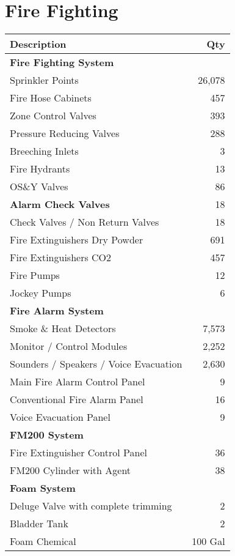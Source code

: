 \documentclass[oneside, justified, 11pt, a4paper]{tufte-book}
\begin{document}
\section{Fire Fighting}

\begin{tabular}{lr}
\toprule
\textbf{Description}	 &\textbf{Qty}\\
\midrule 	 
\textbf{Fire Fighting System}	 &\\
Sprinkler Points	    &26,078\\
Fire Hose Cabinets	    &457 \\
Zone Control Valves	    &393 \\
Pressure Reducing Valves	 &288 \\
Breeching Inlets	        &3\\ 
Fire Hydrants	            &13\\ 
OS\&Y Valves	               &86\\ 
\textbf{Alarm Check Valves}	              &18 \\
Check Valves / Non Return Valves &18 \\
Fire Extinguishers Dry Powder	 &691 \\
Fire Extinguishers CO2	           &457 \\
Fire Pumps	                     &12 \\
Jockey Pumps	                     &6 \\
\midrule 	 
\textbf{Fire Alarm System}	 &\\
Smoke \& Heat Detectors	 &7,573 \\
Monitor / Control Modules	       &2,252 \\
Sounders / Speakers / Voice Evacuation	   &2,630 \\
Main Fire Alarm Control Panel	         &9 \\
Conventional Fire Alarm Panel	        &16 \\
Voice Evacuation Panel	                  &9 \\
\midrule 
\textbf{FM200 System}	 &\\
Fire Extinguisher Control Panel	&36 \\
FM200 Cylinder with Agent	            &38 \\
\midrule 	 
\textbf{Foam System}	 &\\
Deluge Valve with complete trimming	 &2 \\
Bladder Tank	                        &2 \\
Foam Chemical	                   &100 Gal\\
\bottomrule
\end{tabular}
\end{document}
